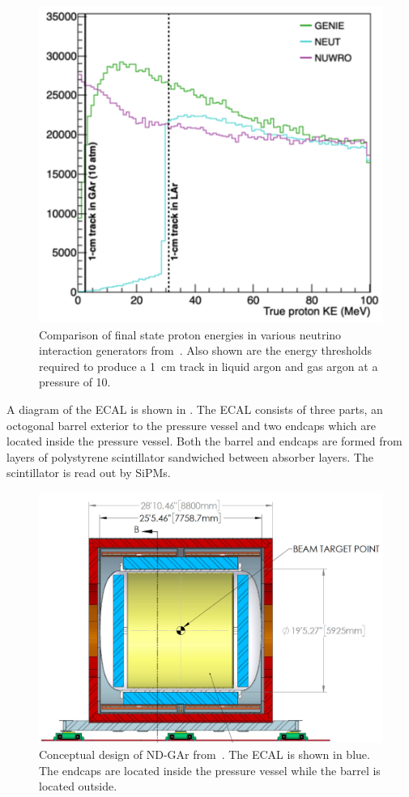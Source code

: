 \begin{figure}[h]
  \centering
  \includegraphics[width=.5\linewidth]{files/figures/dune_detector/generatorProtons}
  \caption[Comparison of final state proton kinetic energies in various neutrino interaction generators]{Comparison of final state proton energies in various neutrino interaction generators from~\cite{ndCdr}. Also shown are the energy thresholds required to produce a \SI{1}{\centi\metre} track in liquid argon and gas argon at a pressure of \SI{10}{\atmosphere}.}
  \label{fig:generatorProtons}
\end{figure}

A diagram of the ECAL is shown in .
The ECAL consists of three parts, an octogonal barrel exterior to the pressure vessel and two endcaps which are located inside the pressure vessel.
Both the barrel and endcaps are formed from layers of polystyrene scintillator sandwiched between absorber layers.
The scintillator is read out by SiPMs.

\begin{figure}[h]
  \centering
  \includegraphics[width=.7\linewidth]{files/figures/dune_detector/ecalDiag}
  \caption[Diagram of ND-GAr ECAL]{Conceptual design of ND-GAr from~\cite{ndCdr}. The ECAL is shown in blue. The endcaps are located inside the pressure vessel while the barrel is located outside.}
  \label{fig:ecalDiag}
\end{figure}

